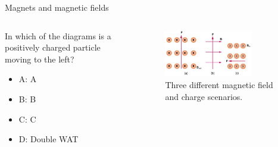 \documentclass{beamer}
\begin{document}
\begin{frame}{Magnets and magnetic fields}
\begin{columns}[T]
\begin{column}{0.3\textwidth}
In which of the diagrams is a positively charged particle moving to the left?
\begin{itemize}
\item A: A
\item B: B
\item C: C
\item D: Double WAT
\end{itemize}
\end{column}
\begin{column}{0.7\textwidth}
\begin{figure}
\centering
\includegraphics[width=0.75\textwidth]{figures/lorentzProblem.png}
\caption{\label{fig:lorentzProblem2} Three different magnetic field and charge scenarios.}
\end{figure}
\end{column}
\end{columns}
\end{frame}
\end{document}

